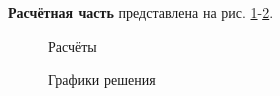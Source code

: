 \documentclass[a4paper, 12pt]{article}
\begin{document}
{\bf Расчётная часть} представлена на рис. \ref{51beg}-\ref{51end}.
\begin{figure}[h]
    \noindent{}
    \caption{Расчёты}
    \label{51beg}
\end{figure}
\begin{figure}[h]
    \noindent{}
    \caption{Графики решения}
    \label{51end}
\end{figure} 
\end{document}
